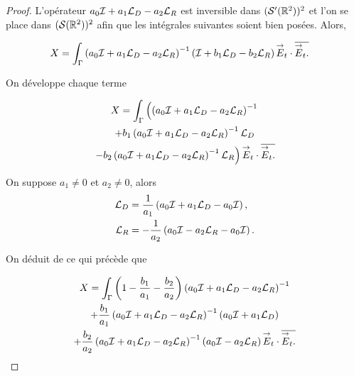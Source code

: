   \begin{proof}
    L'opérateur \(a_0{\mathcal{I}} + a_1 {\mathcal{L}_D} - a_2 {\mathcal{L}_R}\) est  inversible dans \((\mathcal{S}'(\mathbb R^2))^2\) et l'on se place dans \((\mathcal{S}(\mathbb R^2))^2\) afin que les intégrales suivantes soient bien posées.
   Alors,

    \begin{align*}
      X &= \int_\Gamma \left(a_0{\mathcal{I}} + a_1 {\mathcal{L}_D} - a_2 {\mathcal{L}_R} \right)^{-1}\left( {\mathcal{I}} + b_1 {\mathcal{L}_D} - b_2 {\mathcal{L}_R} \right) {\overset{\rightarrow}{E}}_t\cdot {\overline{{\overset{\rightarrow}{E}}_t.}}
    \end{align*}

    On développe chaque terme

    \begin{multline*}
      X = \int_\Gamma \left(\left(a_0{\mathcal{I}} + a_1 {\mathcal{L}_D} - a_2 {\mathcal{L}_R} \right)^{-1}
      \right.
      \\
      + b_1 \left(a_0{\mathcal{I}} + a_1 {\mathcal{L}_D} - a_2 {\mathcal{L}_R} \right)^{-1}{\mathcal{L}_D}
      \\
      \left.
      - b_2 \left(a_0{\mathcal{I}} + a_1 {\mathcal{L}_D} - a_2 {\mathcal{L}_R} \right)^{-1}{\mathcal{L}_R} \right) {\overset{\rightarrow}{E}}_t\cdot {\overline{{\overset{\rightarrow}{E}}_t.}}
    \end{multline*}

    On suppose \(a_1\not=0\) et \(a_2\not=0\), alors
    \begin{align*}
      {\mathcal{L}_D} & = \dfrac{1}{a_1}\left(a_0{\mathcal{I}} + a_1 {\mathcal{L}_D} - a_0{\mathcal{I}}\right),
      \\
      {\mathcal{L}_R} & = -\dfrac{1}{a_2}\left(a_0{\mathcal{I}} - a_2 {\mathcal{L}_R} - a_0{\mathcal{I}}\right).
    \end{align*}


    On déduit de ce qui précède que

    \begin{multline*}
      X = \int_\Gamma \left(1-\dfrac{b_1}{a_1} -\dfrac{b_2}{a_2}\right)\left(a_0{\mathcal{I}} + a_1 {\mathcal{L}_D} - a_2 {\mathcal{L}_R} \right)^{-1}
      \\
      + \dfrac{b_1}{a_1} \left(a_0{\mathcal{I}} + a_1 {\mathcal{L}_D} - a_2 {\mathcal{L}_R} \right)^{-1}\left(a_0{\mathcal{I}} + a_1{\mathcal{L}_D}\right)
      \\
      + \dfrac{b_2}{a_2} \left(a_0{\mathcal{I}} + a_1 {\mathcal{L}_D} - a_2 {\mathcal{L}_R} \right)^{-1}\left(a_0{\mathcal{I}} - a_2{\mathcal{L}_R}\right) {\overset{\rightarrow}{E}}_t\cdot {\overline{{\overset{\rightarrow}{E}}_t.}}
    \end{multline*}


\end{proof}
